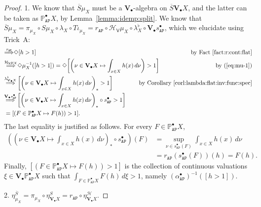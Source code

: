 \documentclass[preprint,12pt]{elsarticle}
\newcommand\Pred{\mathbb{P}}
\newcommand\Angel{{\mathtt{A}}}
\newcommand\Nature{{\mathtt{P}}}
\newcommand\AN{{\Angel\Nature}}
\newcommand\invto[1]{{\buildrel {#1} \over\Longrightarrow}}
\newcommand\Hoare{{\mathcal H}}
\newcommand\Vt{\mathsf{V}}
\newcommand\HV{\Hoare_\Vt}
\newcommand\Val{{\mathbf V}}
\begin{document}
\begin{proof}
  1. We know that $\overline S \mu_X$ must be a $\Val_\bullet$-algebra
  on $\overline S {\Val_\bullet X}$, and the latter can be taken as
  $\Pred_\AN^\bullet X$, by Lemma~\ref{lemma:idemp:split}.  We know
  that
  $\overline S \mu_X = \pi_{\mu_X} \circ S \mu_X \circ \lambda_X \circ
  T\iota_{\mu_X} = r_\AN \circ \HV \mu_X \circ {\lambda^\flat_X} \circ
  \Val_\bullet {s_\AN^\bullet}$, which we elucidate using Trick~A:
  \begin{align*}
    [h > 1]
    & \invto{r_\AN}
      \Diamond {[h > 1]}
    & \text{by Fact~\ref{fact:r:cont:flat}} \\
    & \invto{\HV {\mu_X}}
      \Diamond {\mu_X^{-1} ([h > 1])}
      = \Diamond {\left[\left(\nu \in \Val_\bullet X \mapsto \int_{x \in X} h (x)
      \,d\nu\right) > 1\right]}
      \mskip-80mu
    & \text{by (\ref{eq:mu-1})} \\
    & \invto{\lambda^\flat_{\Val_\bullet X}}
      \left[\left(\nu \in \Val_\bullet X \mapsto \int_{x \in X} h (x)
      \,d\nu\right)_* > 1\right]
    & \text{by Corollary~\ref{corl:lambda:flat:inv:func:spec}} \\
    & \invto{\Val_\bullet {s_\AN^\bullet}}
      \left[\left(\nu \in \Val_\bullet X \mapsto \int_{x \in X} h (x)
      \,d\nu\right)_* \circ s_\AN^\bullet > 1\right] \\
    & = [(F \in \Pred_\AN^\bullet X \mapsto F (h)) > 1].
  \end{align*}
  The last equality is justified as follows.  For every
  $F \in \Pred_\AN^\bullet X$,
  \begin{align*}
    \left(\left(\nu \in \Val_\bullet X \mapsto \int_{x \in X} h (x)
    \,d\nu\right)_* \circ s_\AN^\bullet\right) (F)
    & = \sup_{\nu \in s_\AN^\bullet (F)} \int_{x \in X} h (x)
      \,d\nu \\
    & = r_\AN (s_\AN^\bullet (F)) (h) = F (h).
  \end{align*}
  Finally, $[(F \in \Pred_\AN^\bullet X \mapsto F (h)) > 1]$ is the
  collection of continuous valuations $\xi \in \Val_\bullet
  {\Pred_\AN^\bullet X}$ such that $\int_{F \in \Pred_\AN^\bullet X} F
  (h) \,d\xi > 1$, namely ${(\alpha_\AN^\bullet)}^{-1} ([h > 1])$.

  2.
  $\eta^{\overline S}_{\mu_X} = \pi_{\mu_X} \circ \eta^S_{\Val_\bullet
    X} = r_\AN \circ \eta^\Hoare_{\Val_\bullet X}$.


\end{proof}
\end{document}

